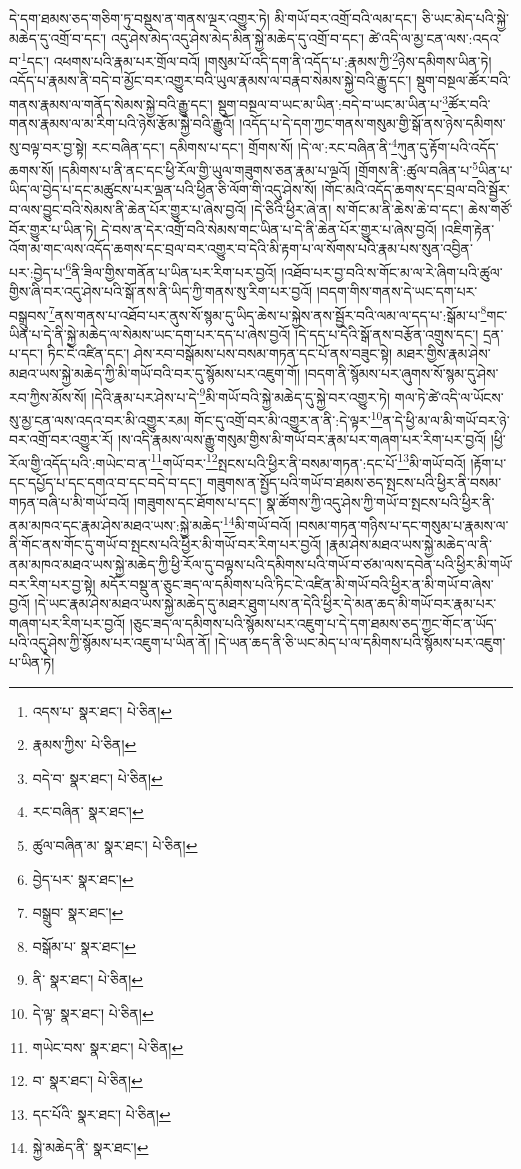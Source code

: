 དེ་དག་ཐམས་ཅད་གཅིག་ཏུ་བསྡུས་ན་གནས་ལྔར་འགྱུར་ཏེ། མི་གཡོ་བར་འགྲོ་བའི་ལམ་དང་། ཅི་ཡང་མེད་པའི་སྐྱེ་མཆེད་དུ་འགྲོ་བ་དང་། འདུ་ཤེས་མེད་འདུ་ཤེས་མེད་མིན་སྐྱེ་མཆེད་དུ་འགྲོ་བ་དང་། ཚེ་འདི་ལ་མྱ་ངན་ལས་:འདའ་བ་\footnote{འདས་པ་  སྣར་ཐང་།  པེ་ཅིན། }དང་། འཕགས་པའི་རྣམ་པར་གྲོལ་བའོ། །གསུམ་པོ་འདི་དག་ནི་འདོད་པ་:རྣམས་ཀྱི་\footnote{རྣམས་ཀྱིས་  པེ་ཅིན། }ཉེས་དམིགས་ཡིན་ཏེ། འདོད་པ་རྣམས་ནི་བདེ་བ་མྱོང་བར་འགྱུར་བའི་ཡུལ་རྣམས་ལ་བརྣབ་སེམས་སྐྱེ་བའི་རྒྱུ་དང་། སྡུག་བསྔལ་ཚོར་བའི་གནས་རྣམས་ལ་གནོད་སེམས་སྐྱེ་བའི་རྒྱུ་དང་། སྡུག་བསྔལ་བ་ཡང་མ་ཡིན་:བདེ་བ་ཡང་མ་ཡིན་པ་\footnote{བདེ་བ་  སྣར་ཐང་།  པེ་ཅིན། }ཚོར་བའི་གནས་རྣམས་ལ་མ་རིག་པའི་ཉེས་རྩོམ་སྐྱེ་བའི་རྒྱུའོ། །འདོད་པ་དེ་དག་ཀྱང་གནས་གསུམ་གྱི་སྒོ་ནས་ཉེས་དམིགས་སུ་བལྟ་བར་བྱ་སྟེ། རང་བཞིན་དང་། དམིགས་པ་དང་། གྲོགས་སོ། །དེ་ལ་:རང་བཞིན་ནི་\footnote{རང་བཞིན་  སྣར་ཐང་། }ཀུན་དུ་རྟོག་པའི་འདོད་ཆགས་སོ། །དམིགས་པ་ནི་ནང་དང་ཕྱི་རོལ་གྱི་ཡུལ་གཟུགས་ཅན་རྣམ་པ་ལྔའོ། །གྲོགས་ནི་:ཚུལ་བཞིན་པ་\footnote{ཚུལ་བཞིན་མ་  སྣར་ཐང་།  པེ་ཅིན། }ཡིན་པ་ཡིད་ལ་བྱེད་པ་དང་མཚུངས་པར་ལྡན་པའི་ཕྱིན་ཅི་ལོག་གི་འདུ་ཤེས་སོ། །གོང་མའི་འདོད་ཆགས་དང་བྲལ་བའི་སྦྱོར་བ་ལས་བྱུང་བའི་སེམས་ནི་ཆེན་པོར་གྱུར་པ་ཞེས་བྱའོ། །དེ་ཅིའི་ཕྱིར་ཞེ་ན། ས་གོང་མ་ནི་ཆེས་ཆེ་བ་དང་། ཆེས་གཙོ་བོར་གྱུར་པ་ཡིན་ཏེ། དེ་བས་ན་དེར་འགྲོ་བའི་སེམས་གང་ཡིན་པ་དེ་ནི་ཆེན་པོར་གྱུར་པ་ཞེས་བྱའོ། །འཇིག་རྟེན་འོག་མ་གང་ལས་འདོད་ཆགས་དང་བྲལ་བར་འགྱུར་བ་དེའི་མི་རྟག་པ་ལ་སོགས་པའི་རྣམ་པས་སུན་འབྱིན་པར་:བྱེད་པ་\footnote{བྱེད་པར་  སྣར་ཐང་། }ནི་ཟིལ་གྱིས་གནོན་པ་ཡིན་པར་རིག་པར་བྱའོ། །འཐོབ་པར་བྱ་བའི་ས་གོང་མ་ལ་རེ་ཞིག་པའི་ཚུལ་གྱིས་ཞི་བར་འདུ་ཤེས་པའི་སྒོ་ནས་ནི་ཡིད་ཀྱི་གནས་སུ་རིག་པར་བྱའོ། །བདག་གིས་གནས་དེ་ཡང་དག་པར་བསྒྲུབས་\footnote{བསྒྲུབ་  སྣར་ཐང་། }ནས་གནས་པ་འཐོབ་པར་ནུས་སོ་སྙམ་དུ་ཡིད་ཆེས་པ་སྐྱེས་ནས་སྦྱོར་བའི་ལམ་ལ་དད་པ་:སྒོམ་པ་\footnote{བསྒོམ་པ་  སྣར་ཐང་། }གང་ཡིན་པ་དེ་ནི་སྐྱེ་མཆེད་ལ་སེམས་ཡང་དག་པར་དད་པ་ཞེས་བྱའོ། །དེ་དད་པ་དེའི་སྒོ་ནས་བརྩོན་འགྲུས་དང་། དྲན་པ་དང་། ཏིང་ངེ་འཛིན་དང་། ཤེས་རབ་བསྒོམས་པས་བསམ་གཏན་དང་པོ་ནས་བཟུང་སྟེ། མཐར་གྱིས་རྣམ་ཤེས་མཐའ་ཡས་སྐྱེ་མཆེད་ཀྱི་མི་གཡོ་བའི་བར་དུ་སྙོམས་པར་འཇུག་གོ། །བདག་ནི་སྙོམས་པར་ཞུགས་སོ་སྙམ་དུ་ཤེས་རབ་ཀྱིས་མོས་སོ། །དེའི་རྣམ་པར་ཤེས་པ་དེ་\footnote{ནི་  སྣར་ཐང་།  པེ་ཅིན། }མི་གཡོ་བའི་སྐྱེ་མཆེད་དུ་སྐྱེ་བར་འགྱུར་ཏེ། གལ་ཏེ་ཚེ་འདི་ལ་ཡོངས་སུ་མྱ་ངན་ལས་འདའ་བར་མི་འགྱུར་རམ། གོང་དུ་འགྲོ་བར་མི་འགྱུར་ན་ནི་:དེ་ལྟར་\footnote{དེ་ལྟ་  སྣར་ཐང་།  པེ་ཅིན། }ན་དེ་ཕྱི་མ་ལ་མི་གཡོ་བར་ཉེ་བར་འགྲོ་བར་འགྱུར་རོ། །ས་འདི་རྣམས་ལས་རྒྱུ་གསུམ་གྱིས་མི་གཡོ་བར་རྣམ་པར་གཞག་པར་རིག་པར་བྱའོ། །ཕྱི་རོལ་གྱི་འདོད་པའི་:གཡེང་བ་ན་\footnote{གཡེང་བས་  སྣར་ཐང་།  པེ་ཅིན། }གཡོ་བར་\footnote{བ་  སྣར་ཐང་།  པེ་ཅིན། }སྤངས་པའི་ཕྱིར་ནི་བསམ་གཏན་:དང་པོ་\footnote{དང་པོའི་  སྣར་ཐང་།  པེ་ཅིན། }མི་གཡོ་བའོ། །རྟོག་པ་དང་དཔྱོད་པ་དང་དགའ་བ་དང་བདེ་བ་དང་། གཟུགས་ན་སྤྱོད་པའི་གཡོ་བ་ཐམས་ཅད་སྤངས་པའི་ཕྱིར་ནི་བསམ་གཏན་བཞི་པ་མི་གཡོ་བའོ། །གཟུགས་དང་ཐོགས་པ་དང་། སྣ་ཚོགས་ཀྱི་འདུ་ཤེས་ཀྱི་གཡོ་བ་སྤངས་པའི་ཕྱིར་ནི་ནམ་མཁའ་དང་རྣམ་ཤེས་མཐའ་ཡས་:སྐྱེ་མཆེད་\footnote{སྐྱེ་མཆེད་ནི་  སྣར་ཐང་། }མི་གཡོ་བའོ། །བསམ་གཏན་གཉིས་པ་དང་གསུམ་པ་རྣམས་ལ་ནི་གོང་ནས་གོང་དུ་གཡོ་བ་སྤངས་པའི་ཕྱིར་མི་གཡོ་བར་རིག་པར་བྱའོ། །རྣམ་ཤེས་མཐའ་ཡས་སྐྱེ་མཆེད་ལ་ནི་ནམ་མཁའ་མཐའ་ཡས་སྐྱེ་མཆེད་ཀྱི་ཕྱི་རོལ་དུ་བལྟས་པའི་དམིགས་པའི་གཡོ་བ་ཙམ་ལས་དབེན་པའི་ཕྱིར་མི་གཡོ་བར་རིག་པར་བྱ་སྟེ། མདོར་བསྡུ་ན་ཅུང་ཟད་ལ་དམིགས་པའི་ཏིང་ངེ་འཛིན་མི་གཡོ་བའི་ཕྱིར་ན་མི་གཡོ་བ་ཞེས་བྱའོ། །དེ་ཡང་རྣམ་ཤེས་མཐའ་ཡས་སྐྱེ་མཆེད་དུ་མཐར་ཐུག་པས་ན་དེའི་ཕྱིར་དེ་མན་ཆད་མི་གཡོ་བར་རྣམ་པར་གཞག་པར་རིག་པར་བྱའོ། །ཅུང་ཟད་ལ་དམིགས་པའི་སྙོམས་པར་འཇུག་པ་དེ་དག་ཐམས་ཅད་ཀྱང་གོང་ན་ཡོད་པའི་འདུ་ཤེས་ཀྱི་སྙོམས་པར་འཇུག་པ་ཡིན་ནོ། །དེ་ཡན་ཆད་ནི་ཅི་ཡང་མེད་པ་ལ་དམིགས་པའི་སྙོམས་པར་འཇུག་པ་ཡིན་ཏེ། 